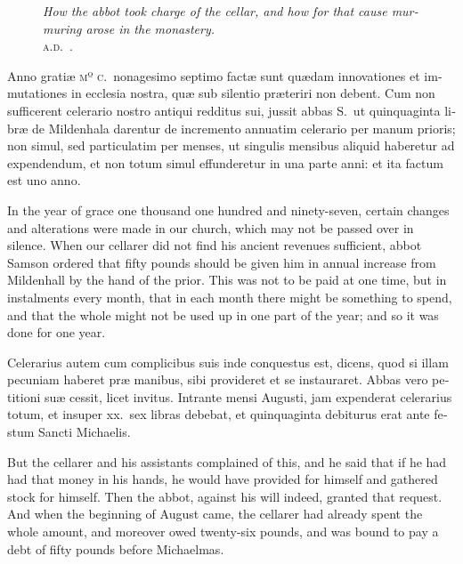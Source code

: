 \documentclass{book}
\newcommand{\blockhead}[4][]{
\begin{figure}
\centering
\vspace{#4}
\parbox{2.75cm}{\begin{center}\footnotesize \color{BrickRed} \emph{#2}\\ #1 \end{center}}
\end{figure}
}
\begin{document}
\begin{paracol}{2}
\switchcolumn*

\begin{otherlanguage}{latin}
\blockhead[\textsc{a.d}.\ .]{How the abbot took charge of the cellar, and how for that cause murmuring arose in the monastery.}{5}{-.6cm} 
Anno grati\ae{} \textsc{mº c}.\ nonagesimo septimo fact\ae{} sunt qu\ae{}dam innovationes et immutationes in ecclesia nostra, qu\ae{} sub silentio pr\ae{}teriri non debent. Cum non sufficerent celerario nostro antiqui redditus sui, jussit abbas S.\ ut quinquaginta libr\ae{} de Mildenhala darentur de incremento annuatim celerario per manum prioris; non simul, sed particulatim per menses, ut singulis mensibus aliquid haberetur ad expendendum, et non totum simul effunderetur in una parte anni: et ita factum est uno anno.

\end{otherlanguage}

\switchcolumn

In the year of grace one thousand one hundred and ninety-seven, certain changes and alterations were made 
in our church, which may not be passed over in silence. When our cellarer did not find his ancient revenues sufficient, abbot Samson ordered that fifty pounds should be given him in annual increase from Mildenhall by the hand of the prior. This was not to be paid at one time, but in instalments every month, that in each month there might be something to spend, and that the whole might not be used up in one part of the year; and so it was done for one year.

\switchcolumn*

\begin{otherlanguage}{latin}
Celerarius autem cum complicibus suis inde conquestus est, dicens, quod si illam pecuniam haberet pr\ae{} manibus, sibi provideret et se instauraret. Abbas vero petitioni su\ae{} cessit, licet invitus. Intrante mensi Augusti, jam expenderat celerarius totum, et insuper xx.\ sex libras debebat, et quinquaginta debiturus erat ante festum Sancti Michaelis.
\end{otherlanguage}

\switchcolumn

But the cellarer and his assistants complained of this, and he said that if he had had that money in his hands, he would have provided for himself and gathered stock for himself. Then the abbot, against his will indeed, granted that request. And when the beginning of August came, the cellarer had already spent the whole amount, and moreover owed twenty-six pounds, and was bound to pay a debt of fifty pounds before Michaelmas.


\end{paracol}
\end{document}
